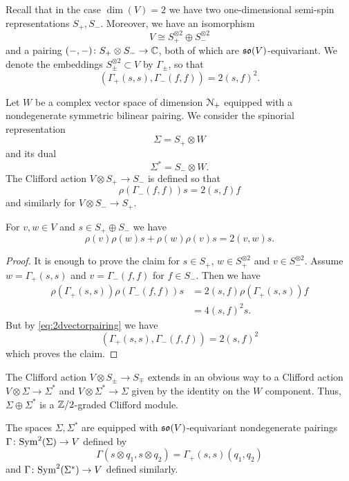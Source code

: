 \documentclass[10pt, oneside]{article}
\begin{document}
Recall that in the case $\dim(V) = 2$ we have two one-dimensional semi-spin representations $S_+, S_-$. Moreover, we have an isomorphism
\[V\cong S_+^{\otimes 2}\oplus S_-^{\otimes 2}\]
and a pairing $( -, -)\colon S_+\otimes S_-\rightarrow \mathbb C$, both of which are $\mathfrak{so}(V)$-equivariant. We denote the embeddings $S_{\pm}^{\otimes 2}\subset V$ by $\Gamma_{\pm}$, so that
\begin{equation}
(\Gamma_+(s, s), \Gamma_-(f, f)) = 2(s, f)^2.
\label{eq:2dvectorpairing}
\end{equation}

Let $W$ be a complex vector space of dimension $\mathcal N_+$ equipped with a nondegenerate symmetric bilinear pairing. We consider the spinorial representation
\[\Sigma = S_+\otimes W\]
and its dual
\[\Sigma^* = S_-\otimes W.\]
The Clifford action $V\otimes S_+\rightarrow S_-$ is defined so that
\[\rho(\Gamma_-(f, f)) s = 2(s, f) f\]
and similarly for $V\otimes S_-\rightarrow S_+$.

\begin{prop}
For $v,w\in V$ and $s\in S_+\oplus S_-$ we have
\[\rho(v)\rho(w)s + \rho(w)\rho(v) s = 2(v, w) s.\]
\end{prop}
\begin{proof}
It is enough to prove the claim for $s\in S_+$, $w\in S_+^{\otimes 2}$ and $v\in S_-^{\otimes 2}$. Assume $w=\Gamma_+(s, s)$ and $v = \Gamma_-(f, f)$ for $f\in S_-$. Then we have
\begin{align*}
\rho(\Gamma_+(s, s)) \rho(\Gamma_-(f, f)) s &= 2(s, f) \rho(\Gamma_+(s, s)) f \\
&= 4(s, f)^2 s.
\end{align*}
But by \eqref{eq:2dvectorpairing} we have
\[(\Gamma_+(s, s), \Gamma_-(f, f)) = 2(s, f)^2\]
which proves the claim.
\end{proof}

The Clifford action $V\otimes S_{\pm}\rightarrow S_{\mp}$ extends in an obvious way to a Clifford action $V\otimes \Sigma\rightarrow \Sigma^*$ and $V\otimes \Sigma^*\rightarrow \Sigma$ given by the identity on the $W$ component. Thus, $\Sigma\oplus \Sigma^*$ is a $\mathbb Z/2$-graded Clifford module.

The spaces $\Sigma, \Sigma^*$ are equipped with $\mathfrak{so}(V)$-equivariant nondegenerate pairings $\Gamma\colon {\rm Sym}^2(\Sigma)\rightarrow V$ defined by
\[\Gamma(s\otimes q_1, s\otimes q_2) = \Gamma_+(s, s) (q_1, q_2)\]
and $\Gamma\colon {\rm Sym}^2(\Sigma^*)\rightarrow V$ defined similarly.
\end{document}
